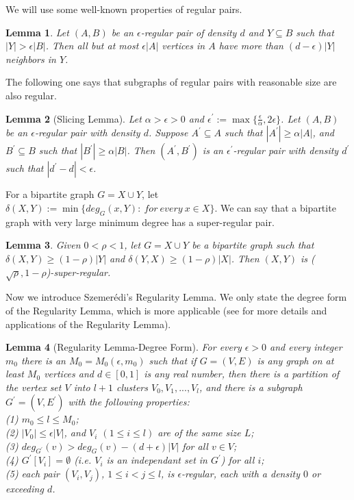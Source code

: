 \documentclass[11pt]{article}
\newtheorem{lemma}{Lemma}
\begin{document}
We will use some well-known properties of regular pairs.

\begin{lemma}\label{large}\cite{regularity}
Let $(A,B)$ be an $\epsilon $-regular pair of density $d$ and $Y\subseteq B$ such that $|Y|>\epsilon |B|$. Then all but at most $\epsilon |A|$ vertices in $A$ have more than $(d-\epsilon )|Y|$ neighbors in $Y$.
\end{lemma}

The following one says that subgraphs of regular pairs with reasonable size are also regular.

\begin{lemma}[Slicing Lemma]\label{slicing}\cite{regularity}
Let $\alpha >\epsilon >0$ and $\epsilon ^{'}:=\max \{\frac{\epsilon }{\alpha },2\epsilon \}$. Let $(A,B)$ be an $\epsilon $-regular pair with density $d$. Suppose $A^{'}\subseteq A$ such that $|A^{'}|\geq \alpha |A|$, and $B^{'}\subseteq B$ such that $|B^{'}|\geq \alpha |B|$. Then $(A^{'},B^{'})$ is an $\epsilon^{'}$-regular pair with density $d^{'}$ such that $|d^{'}-d|<\epsilon $.
\end{lemma}

For a bipartite graph $G=X\cup Y$, let $\delta(X,Y):=\min\{deg_G(x,Y):\ for\ every\ x\in X\}$. We can say that a bipartite graph with very large minimum degree has a super-regular pair.

\begin{lemma}\cite{chen}\label{chen}
Given $0<\rho<1$, let $G=X\cup Y$ be a bipartite graph such that $\delta (X,Y)\geq (1-\rho)|Y|$ and $\delta (Y,X)\geq (1-\rho)|X|$. Then $(X,Y)$ is ($\sqrt{\rho},1-\rho $)-super-regular.
\end{lemma}

Now we introduce Szemer\'{e}di's Regularity Lemma. We only state the degree form of the Regularity Lemma, which is more applicable (see \cite{regularity} for more details and applications of the Regularity Lemma).

\begin{lemma}[Regularity Lemma-Degree Form]\label{regular}
For every $\epsilon >0$ and every integer $m_0$ there is an $M_0=M_0(\epsilon, m_0)$ such that if $G=(V,E)$ is any graph on at least $M_0$ vertices and $d \in [0,1]$ is any real number, then there is a partition of the vertex set $V$ into $l+1$ clusters $V_0, V_1,..., V_l$, and there is a subgraph $G^{'}=(V,E^{'})$ with the following properties:\\
(1) $m_0\leq l\leq M_0$;\\
(2) $|V_0|\leq \epsilon |V|$, and $V_i$ $(1\leq i\leq l)$ are of the same size $L$;\\
(3) $deg_{G^{'}}(v)>deg_{G}(v)-(d +\epsilon)|V|$ for all $v\in V$;\\
(4) $G^{'}[V_i]= \emptyset $ (i.e. $V_i$ is an independant set in $G^{'}$) for all $i$;\\
(5) each pair $(V_i, V_j)$, $1\leq i<j\leq l$, is $\epsilon$-regular, each with a density $0$ or exceeding $d$.
\end{lemma}
\end{document}
